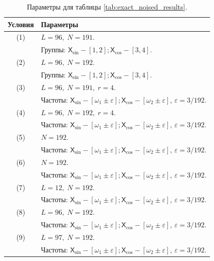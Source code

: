 \documentclass[12pt, specialist, subf
]{disser}
\theoremstyle{definition}
\newcommand{\TS}{\mathsf{X}}
\begin{document}
\begin{table}[H]
  \caption{Параметры для таблицы \ref{tab:exact_noised_results}.}
  \centering
  \label{tab:exact_noised_parameters}
  \begin{tabularx}{\textwidth}{|c|X|}
    \hline
    \textbf{Условия} & \textbf{Параметры} \\
    \hline
    (1) & \( L = 96,\; N = 191 \). \\ & Группы: $\TS_{\sin} - [1,2]; \TS_{\cos} - [3,4]$. \\
    \hline
    (2) & \( L = 96,\; N = 192 \). \\ & Группы: $\TS_{\sin} - [1,2]; \TS_{\cos} - [3,4]$. \\
    \hline
    (3) & \( L = 96,\; N = 191,\; r = 4\). \\
            & Частоты: $\TS_{\sin} - [\omega_1 \pm \varepsilon]; \TS_{\cos} - [\omega_2 \pm \varepsilon]$, $\varepsilon = 3/192$. \\
    \hline
    (4) & \( L = 96,\; N = 192,\; r = 4 \). \\
            & Частоты: $\TS_{\sin} - [\omega_1 \pm \varepsilon]; \TS_{\cos} - [\omega_2 \pm \varepsilon]$, $\varepsilon = 3/192$. \\
    \hline
    (5) & \( N = 192 \). \\
            & Частоты: $\TS_{\sin} - [\omega_1 \pm \varepsilon]; \TS_{\cos} - [\omega_2 \pm \varepsilon]$, $\varepsilon = 3/192$. \\
    \hline
    (6) & \( N = 192 \). \\
            & Частоты: $\TS_{\sin} - [\omega_1 \pm \varepsilon]; \TS_{\cos} - [\omega_2 \pm \varepsilon]$, $\varepsilon = 3/192$. \\
    \hline
    (7) & \(L = 12,\;N = 192 \). \\
            & Частоты: $\TS_{\sin} - [\omega_1 \pm \varepsilon]; \TS_{\cos} - [\omega_2 \pm \varepsilon]$, $\varepsilon = 3/192$. \\
    \hline
    (8) & \( L = 96,\; N = 192 \). \\
            & Частоты: $\TS_{\sin} - [\omega_1 \pm \varepsilon]; \TS_{\cos} - [\omega_2 \pm \varepsilon]$, $\varepsilon = 3/192$. \\
    \hline
    (9) & \( L = 97,\; N = 192 \). \\
            & Частоты: $\TS_{\sin} - [\omega_1 \pm \varepsilon]; \TS_{\cos} - [\omega_2 \pm \varepsilon]$, $\varepsilon = 3/192$. \\
    \hline
  \end{tabularx}
\end{table}
\end{document}

